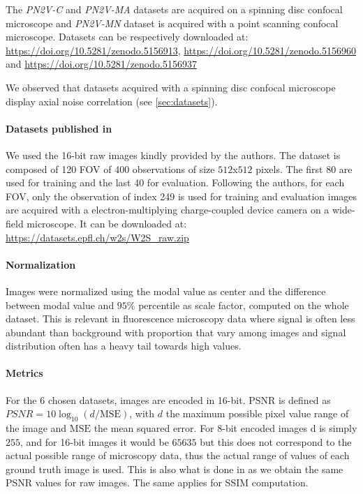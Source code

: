 \documentclass[lettersize,journal]{IEEEtran}
\begin{document}
The \emph{PN2V-C} and \emph{PN2V-MA} datasets are acquired on a spinning disc confocal microscope and \emph{PN2V-MN} dataset is acquired with a point scanning confocal microscope.
Datasets can be respectively downloaded at: \url{https://doi.org/10.5281/zenodo.5156913}, \url{https://doi.org/10.5281/zenodo.5156960} and \url{https://doi.org/10.5281/zenodo.5156937}

We observed that datasets acquired with a spinning disc confocal microscope display axial noise correlation (see \ref{sec:datasets}).

\paragraph{Datasets published in \cite{zhou2020w2s}}

We used the 16-bit raw images kindly provided by the authors.
The dataset is composed of 120 FOV of 400 observations of size $512$x$512$ pixels.
The first 80 are used for training and the last 40 for evaluation.
Following the authors, for each FOV, only the observation of index 249 is used for training and evaluation
images are acquired with a electron-multiplying charge-coupled device camera on a wide-field microscope.
It can be downloaded at: \url{https://datasets.epfl.ch/w2s/W2S_raw.zip}

\paragraph{Normalization}

Images were normalized using the modal value as center and the difference between modal value and $95\%$ percentile as scale factor, computed on the whole dataset.
This is relevant in fluorescence microscopy data where signal is often less abundant than background with proportion that vary among images and signal distribution often has a heavy tail towards high values.

\paragraph{Metrics}
For the 6 chosen datasets, images are encoded in 16-bit.
PSNR is defined as $PSNR = 10 \log_{10}(d/\mathrm{MSE})$, with $d$ the maximum possible pixel value range of the image and $\mathrm{MSE}$ the mean squared error.
For 8-bit encoded images d is simply $255$, and for 16-bit images it would be $65635$ but this does not correspond to the actual possible range of microscopy data, thus the actual range of values of each ground truth image is used. This is also what is done in \cite{goncharova2020} as we obtain the same PSNR values for raw images.
The same applies for SSIM computation.
\end{document}
